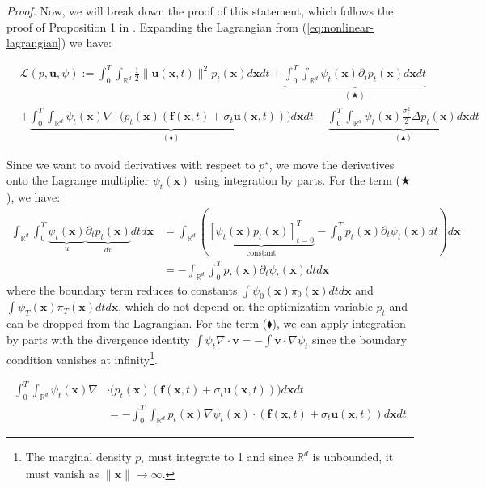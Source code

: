 \documentclass{article}
\begin{document}
\textit{Proof.} Now, we will break down the proof of this statement, which follows the proof of Proposition 1 in \citep{caluya2021wasserstein}. Expanding the Lagrangian from (\ref{eq:nonlinear-lagrangian}) we have:
\begin{small}
\begin{align}
    &\mathcal{L}(p,\boldsymbol{u},\psi):=\int_0^T\int_{\mathbb{R}^d}\frac{1}{2}\|\boldsymbol{u}(\boldsymbol{x},t)\|^2p_t(\boldsymbol{x})d\boldsymbol{x}dt+\underbrace{\int_0^T\int_{\mathbb{R}^d}\psi_t(\boldsymbol{x})\partial_tp_t(\boldsymbol{x})d\boldsymbol{x}dt}_{(\bigstar)}\nonumber\\
    &+\underbrace{\int_0^T\int_{\mathbb{R}^d}\psi_t (\boldsymbol{x})\nabla\cdot\big(p_t(\boldsymbol{x})(\boldsymbol{f}(\boldsymbol{x},t) +\sigma_t\boldsymbol{u}(\boldsymbol{x},t))\big)d\boldsymbol{x}dt}_{(\blacklozenge)}-\underbrace{\int_0^T\int_{\mathbb{R}^d}\psi_t (\boldsymbol{x})\frac{\sigma_t^2}{2}\Delta p_t(\boldsymbol{x})d\boldsymbol{x}dt}_{(\blacktriangle)}\label{eq:lagrangian-labeled}
\end{align}
\end{small}
Since we want to avoid derivatives with respect to $p^\star$, we move the derivatives onto the Lagrange multiplier $\psi_t(\boldsymbol{x})$ using integration by parts. For the term ($\bigstar$), we have:
\begin{align}
    \int_{\mathbb{R}^d}\int_0^T\underbrace{\psi_t(\boldsymbol{x})}_{u}\underbrace{\partial_tp_t(\boldsymbol{x})}_{dv}dtd\boldsymbol{x}&=\int_{\mathbb{R}^d}\left(\underbrace{[\psi_t(\boldsymbol{x})p_t(\boldsymbol{x})]_{t=0}^T}_{\text{constant}}-\int_0^Tp_t(\boldsymbol{x})\partial_t \psi_t(\boldsymbol{x})dt\right)d\boldsymbol{x}\nonumber\\
    &=-\int_{\mathbb{R}^d}\int_0^Tp_t(\boldsymbol{x})\partial_t\psi_t(\boldsymbol{x})dtd\boldsymbol{x}
\end{align}
where the boundary term reduces to constants $\int\psi_0 (\boldsymbol{x})\pi_0(\boldsymbol{x})dtd\boldsymbol{x}$ and $\int\psi_T (\boldsymbol{x})\pi_T(\boldsymbol{x})dtd\boldsymbol{x}$, which do not depend on the optimization variable $p_t$ and can be dropped from the Lagrangian. For the term ($\blacklozenge$), we can apply integration by parts with the divergence identity $\int\psi_t\nabla\cdot \boldsymbol{v}=-\int \boldsymbol{v}\cdot \nabla\psi_t$ since the boundary condition vanishes at infinity\footnote{The marginal density $p_t$ must integrate to 1 and since $\mathbb{R}^d$ is unbounded, it must vanish as $\|\boldsymbol{x}\|\to \infty$.}.
\begin{small}
\begin{align}
    \int_0^T\int_{\mathbb{R}^d}\psi_t (\boldsymbol{x})\nabla&\cdot\big(p_t(\boldsymbol{x})(\boldsymbol{f}(\boldsymbol{x},t) +\sigma_t\boldsymbol{u}(\boldsymbol{x},t))\big)d\boldsymbol{x}dt\nonumber\\
    &=-\int_0^T\int_{\mathbb{R}^d}p_t(\boldsymbol{x})\nabla \psi_t (\boldsymbol{x})\cdot (\boldsymbol{f}(\boldsymbol{x},t) +\sigma_t\boldsymbol{u}(\boldsymbol{x},t)) d\boldsymbol{x}dt
\end{align}
\end{small}
\end{document}

